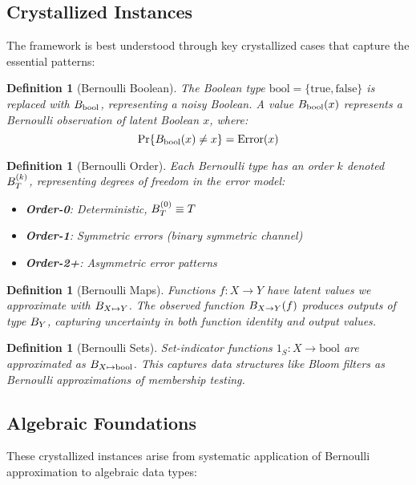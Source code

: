 \documentclass[11pt,final,hidelinks]{article}
\newtheorem{definition}[theorem]{Definition}
\begin{document}
\subsection{Crystallized Instances}

The framework is best understood through key crystallized cases that capture the essential patterns:

\begin{definition}[Bernoulli Boolean]
The Boolean type $\mathrm{bool} = \{\mathrm{true}, \mathrm{false}\}$ is replaced with $B_{\mathrm{bool}}$, representing a noisy Boolean. A value $B_{\mathrm{bool}}(x)$ represents a Bernoulli observation of latent Boolean $x$, where:
$$\Pr\{B_{\mathrm{bool}}(x) \neq x\} = \text{Error}(x)$$
\end{definition}

\begin{definition}[Bernoulli Order]
Each Bernoulli type has an \emph{order} $k$ denoted $B_{T}^{(k)}$, representing degrees of freedom in the error model:
\begin{itemize}
    \item \textbf{Order-0}: Deterministic, $B_{T}^{(0)} \equiv T$
    \item \textbf{Order-1}: Symmetric errors (binary symmetric channel)
    \item \textbf{Order-2+}: Asymmetric error patterns
\end{itemize}
\end{definition}

\begin{definition}[Bernoulli Maps]
Functions $f: X \to Y$ have latent values we approximate with $B_{X \mapsto Y}$. The observed function $B_{X \to Y}(f)$ produces outputs of type $B_{Y}$, capturing uncertainty in both function identity and output values.
\end{definition}

\begin{definition}[Bernoulli Sets]
Set-indicator functions $1_S: X \to \mathrm{bool}$ are approximated as $B_{X \mapsto \mathrm{bool}}$. This captures data structures like Bloom filters as Bernoulli approximations of membership testing.
\end{definition}

\subsection{Algebraic Foundations}

These crystallized instances arise from systematic application of Bernoulli approximation to algebraic data types:
\end{document}

